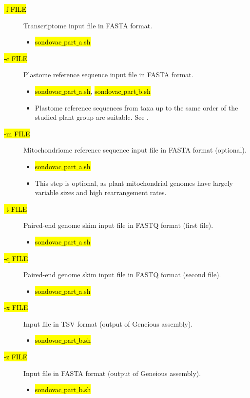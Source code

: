 \documentclass[a4paper, 11pt, twoside]{article}
\renewcommand{\texttt}[1]{\hl{\ttfamily #1}}
\begin{document}
\begin{description}
\item[\texttt{-f FILE}] Transcriptome input file in FASTA format.
  \begin{itemize}
    \item \texttt{sondovac$\_$part$\_$a.sh}
  \end{itemize}
\item[\texttt{-c FILE}] Plastome reference sequence input file in FASTA format.
  \begin{itemize}
    \item \texttt{sondovac$\_$part$\_$a.sh}, \texttt{sondovac$\_$part$\_$b.sh}
    \item Plastome reference sequences from taxa up to the same order of the studied plant group are suitable. See \citet{Straub2012}.
  \end{itemize}
\item[\texttt{-m FILE}] Mitochondriome reference sequence input file in FASTA format (optional).
  \begin{itemize}
    \item \texttt{sondovac$\_$part$\_$a.sh}
    \item This step is optional, as plant mitochondrial genomes have largely variable sizes and high rearrangement rates.
  \end{itemize}
\item[\texttt{-t FILE}] Paired-end genome skim input file in FASTQ format (first file).
  \begin{itemize}
    \item \texttt{sondovac$\_$part$\_$a.sh}
  \end{itemize}
\item[\texttt{-q FILE}] Paired-end genome skim input file in FASTQ format (second file).
  \begin{itemize}
    \item \texttt{sondovac$\_$part$\_$a.sh}
  \end{itemize}
\item[\texttt{-x FILE}] Input file in TSV format (output of Geneious assembly).
  \begin{itemize}
    \item \texttt{sondovac$\_$part$\_$b.sh}
  \end{itemize}
\item[\texttt{-z FILE}] Input file in FASTA format (output of Geneious assembly).
  \begin{itemize}
    \item \texttt{sondovac$\_$part$\_$b.sh}
  \end{itemize}
\end{description}
\end{document}
